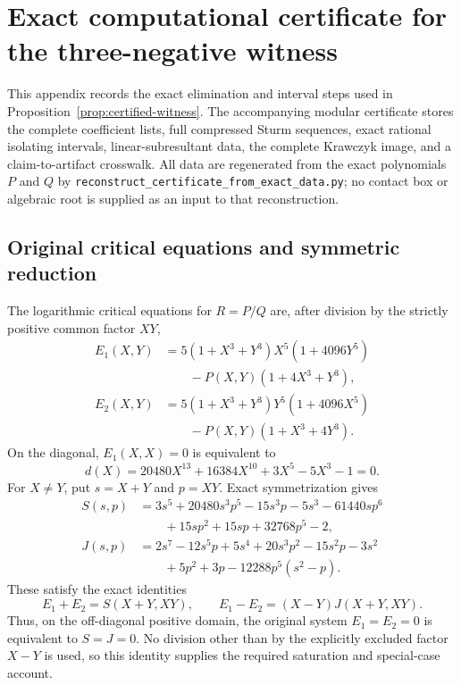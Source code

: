 \appendix
\section{Exact computational certificate for the three-negative witness}\label{app:certificate}
This appendix records the exact elimination and interval steps used in Proposition~\ref{prop:certified-witness}. The accompanying modular certificate stores the complete coefficient lists, full compressed Sturm sequences, exact rational isolating intervals, linear-subresultant data, the complete Krawczyk image, and a claim-to-artifact crosswalk. All data are regenerated from the exact polynomials $P$ and $Q$ by \texttt{reconstruct\_certificate\_from\_exact\_data.py}; no contact box or algebraic root is supplied as an input to that reconstruction.
\subsection{Original critical equations and symmetric reduction}
The logarithmic critical equations for $R=P/Q$ are, after division by the strictly positive common factor $XY$,
\begin{align*}
E_1(X,Y)&=5(1+X^3+Y^3)X^5(1+4096Y^5)\\
&\qquad-P(X,Y)(1+4X^3+Y^3),\\
E_2(X,Y)&=5(1+X^3+Y^3)Y^5(1+4096X^5)\\
&\qquad-P(X,Y)(1+X^3+4Y^3).
\end{align*}
On the diagonal, $E_1(X,X)=0$ is equivalent to
\[
d(X)=20480X^{13}+16384X^{10}+3X^5-5X^3-1=0.
\]
For $X\ne Y$, put $s=X+Y$ and $p=XY$. Exact symmetrization gives
\begin{align*}
S(s,p)&=3s^5+20480s^3p^5-15s^3p-5s^3-61440sp^6\\
&\qquad+15sp^2+15sp+32768p^5-2,\\
J(s,p)&=2s^7-12s^5p+5s^4+20s^3p^2-15s^2p-3s^2\\
&\qquad+5p^2+3p-12288p^5(s^2-p).
\end{align*}
These satisfy the exact identities
\[
E_1+E_2=S(X+Y,XY),\qquad E_1-E_2=(X-Y)J(X+Y,XY).
\]
Thus, on the off-diagonal positive domain, the original system $E_1=E_2=0$ is equivalent to $S=J=0$. No division other than by the explicitly excluded factor $X-Y$ is used, so this identity supplies the required saturation and special-case account.
